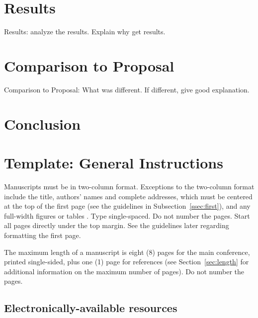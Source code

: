 \documentclass[11pt,letterpaper]{article}
\begin{document}
\section{Results}
Results: analyze the results. Explain why get results.

\section{Comparison to Proposal}
Comparison to Proposal:
What was different. If different, give good explanation.

\section{Conclusion}




\section{Template: General Instructions}

Manuscripts must be in two-column format.  Exceptions to the
two-column format include the title, authors' names and complete
addresses, which must be centered at the top of the first page (see
the guidelines in Subsection~\ref{ssec:first}), and any full-width
figures or tables .  Type single-spaced.  Do not number the pages.
Start all pages directly under the top margin.  See the guidelines
later regarding formatting the first page.



The maximum length of a manuscript is eight (8) pages for the main
conference, printed single-sided, plus one (1) page for references
(see Section~\ref{sec:length} for additional information on the
maximum number of pages).  Do not number the pages.

\subsection{Electronically-available resources}
\end{document}

